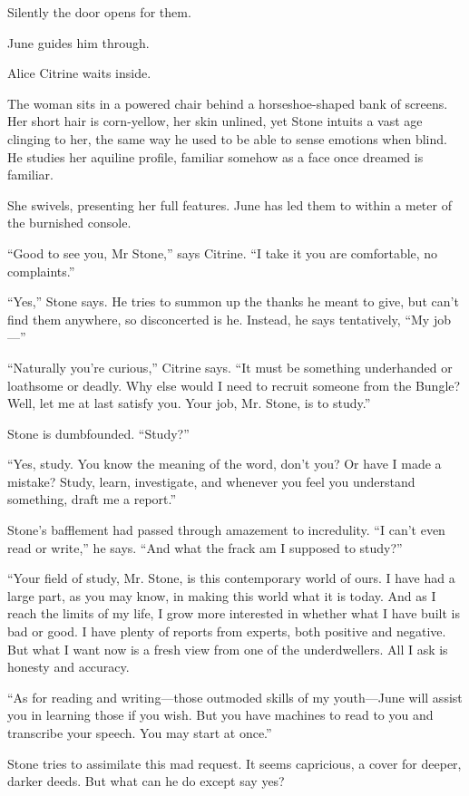 Silently the door opens for them.

June guides him through.

Alice Citrine waits inside.

The woman sits in a powered chair behind a horseshoe-shaped bank of screens. Her short hair is corn-yellow, her skin unlined, yet Stone intuits a vast age clinging to her, the same way he used to be able to sense emotions when blind. He studies her aquiline profile, familiar somehow as a face once dreamed is familiar.

She swivels, presenting her full features. June has led them to within a meter of the burnished console.

“Good to see you, Mr Stone,” says Citrine. “I take it you are comfortable, no complaints.”

“Yes,” Stone says. He tries to summon up the thanks he meant to give, but can’t find them anywhere, so disconcerted is he. Instead, he says tentatively, “My job—”

“Naturally you’re curious,” Citrine says. “It must be something underhanded or loathsome or deadly. Why else would I need to recruit someone from the Bungle? Well, let me at last satisfy you. Your job, Mr. Stone, is to study.”

Stone is dumbfounded. “Study?”

“Yes, study. You know the meaning of the word, don’t you? Or have I made a mistake? Study, learn, investigate, and whenever you feel you understand something, draft me a report.”

Stone’s bafflement had passed through amazement to incredulity. “I can’t even read or write,” he says. “And what the frack am I supposed to study?”

“Your field of study, Mr. Stone, is this contemporary world of ours. I have had a large part, as you may know, in making this world what it is today. And as I reach the limits of my life, I grow more interested in whether what I have built is bad or good. I have plenty of reports from experts, both positive and negative. But what I want now is a fresh view from one of the underdwellers. All I ask is honesty and accuracy.

“As for reading and writing—those outmoded skills of my youth—June will assist you in learning those if you wish. But you have machines to read to you and transcribe your speech. You may start at once.”

Stone tries to assimilate this mad request. It seems capricious, a cover for deeper, darker deeds. But what can he do except say yes?

